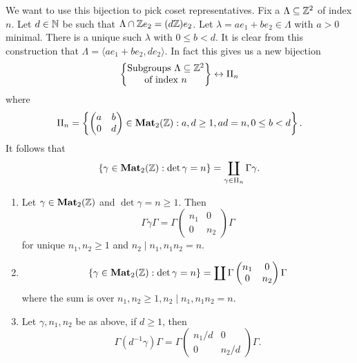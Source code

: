 \documentclass{memoir}
\begin{document}
We want to use this bijection to pick coset representatives.
Fix a $\Lambda\subseteq \mathbb{Z}^2$ of index $n$.
Let $d\in\mathbb{N}$ be such that $\Lambda \cap \mathbb{Z} e_2 = (d\mathbb{Z})e_2$.
Let $\lambda = ae_1+be_2 \in \Lambda$ with $a>0$ minimal.
There is a unique such $\lambda$ with $0\le b < d$.
It is clear from this construction that $\Lambda = \langle ae_1+be_2,de_2 \rangle$.
In fact this gives us a new bijection
\begin{equation}
\left\{ \begin{matrix} \text{Subgroups $\Lambda\subseteq\mathbb{Z}^2$} \\ \text{of index $n$}\end{matrix} \right\} \leftrightarrow \Pi_n
\end{equation}
where 
\begin{equation}
    \Pi_n = \left\{ \begin{pmatrix} a & b \\ 0 & d\end{pmatrix}\in\mathbf{Mat}_2(\mathbb{Z}) : a,d\ge 1, ad = n, 0\le b< d \right\}.
\end{equation}
It follows that
\begin{equation}
    \left\{\gamma\in\mathbf{Mat}_2(\mathbb{Z}):\det\gamma = n\right\} = \coprod_{\gamma\in\Pi_n}\Gamma\gamma.
\end{equation}
\begin{proposition}
    \begin{enumerate}
        \item Let $\gamma\in\mathbf{Mat}_2(\mathbb{Z})$ and $\det\gamma = n\ge 1$. Then
            \begin{equation}
                \Gamma\gamma\Gamma = \Gamma\begin{pmatrix}n_1 & 0 \\ 0 & n_2\end{pmatrix}\Gamma
            \end{equation}
            for unique $n_1,n_2\ge 1$ and $n_2\mid n_1, n_1n_2 = n$.
        \item 
            \begin{equation}
                \{\gamma\in\mathbf{Mat}_2(\mathbb{Z}) : \det\gamma = n\} = \coprod \Gamma\begin{pmatrix}n_1 & 0 \\ 0 & n_2\end{pmatrix}\Gamma
            \end{equation}
            where the sum is over $n_1,n_2\ge 1, n_2\mid n_1, n_1n_2 = n$.
        \item Let $\gamma,n_1,n_2$ be as above, if $d\ge1$, then
            \begin{equation}
                \Gamma(d^{-1}\gamma)\Gamma = \Gamma\begin{pmatrix}n_1/d & 0 \\ 0 & n_2/d\end{pmatrix}\Gamma.
            \end{equation}
    \end{enumerate}
\end{proposition}
\end{document}
